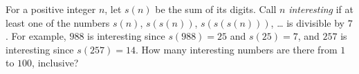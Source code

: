 For a positive integer $n$, let $s(n)$ be the sum of its digits. Call $n$ \emph{interesting} if at least one of the numbers $s(n)$, $s(s(n))$, $s(s(s(n)))$, \dots{} is divisible by $7$. For example, $988$ is interesting since $s(988)=25$ and $s(25)=7$, and $257$ is interesting since $s(257)=14$. How many interesting numbers are there from $1$ to $100$, inclusive?
